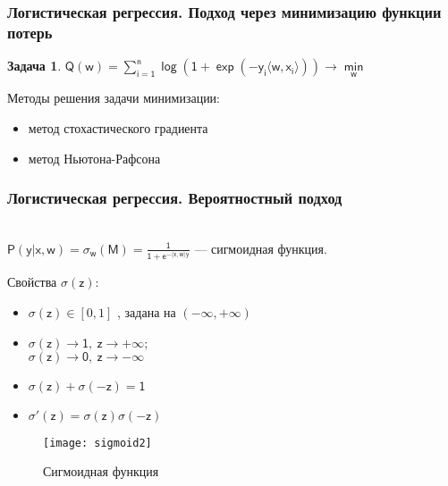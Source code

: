 \documentclass[unicode, notheorems]{beamer}
\newtheorem{task}{Задача}
\begin{document}
\begin{frame}
\frametitle{Логистическая регрессия. Подход через минимизацию функции потерь}

\begin{task}
	$\mathsf{Q(w)=\sum \limits_{i=1}^n \log (1+\exp{(-y_i\langle w,x_i\rangle)}) \to \min \limits_{w}}$
\end{task}

Методы решения задачи минимизации:
\begin{itemize}
	\item метод стохастического градиента
	\item метод Ньютона-Рафсона
\end{itemize}
\end{frame}

\begin{frame}
\frametitle{Логистическая регрессия. Вероятностный подход}
~~\\

$\mathsf{P(y|x,w)=\sigma_w(M)=\frac{1}{1+e^{-\langle x,w \rangle y}}}$ --- сигмоидная функция.

Свойства $\mathsf{\sigma(z)}$:
\begin{itemize}
	\item $\mathsf{\sigma(z)} \in [0,1]$ , задана на $(-\infty,+\infty)$ \\
	\item {$\mathsf{\sigma(z)\to 1,~ z\to +\infty};$ \\ $\mathsf{\sigma(z)\to 0,~ z\to -\infty} $} \\
	\item $\mathsf{\sigma(z)+\sigma(-z)=1}$ \\
	\item $\mathsf{\sigma ' (z)=\sigma (z)\sigma(-z)}$ \\
\end{itemize}

\begin{figure}[h]
	\begin{center}
		\begin{minipage}[h]{0.4\linewidth}
			\texttt{[image: sigmoid2]}
			\caption{Сигмоидная функция}
			\label{series_IRLS} %
		\end{minipage}
		
	\end{center}
\end{figure}
\end{frame}
\end{document}
